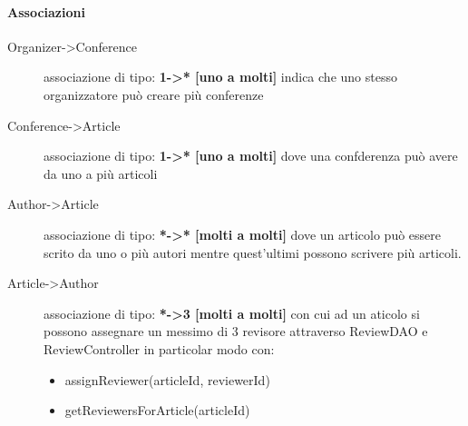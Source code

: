 \paragraph{Associazioni}
\begin{description}
\item [Organizer->Conference] associazione di tipo: \textbf{1->* [uno a molti]} indica che uno stesso organizzatore può creare più conferenze
\item [Conference->Article] associazione di tipo: \textbf{1->* [uno a molti]} dove una confderenza può avere da uno a più articoli
\item [Author->Article] associazione di tipo: \textbf{*->* [molti a molti]} dove un articolo può essere scrito da uno o più autori mentre quest'ultimi possono scrivere più articoli.
\item [Article->Author] associazione di tipo: \textbf{*->3 [molti a molti]} con cui ad un aticolo si possono assegnare un messimo di 3 revisore attraverso ReviewDAO e ReviewController in particolar modo con:
\begin{itemize}
 \item assignReviewer(articleId, reviewerId)
\item getReviewersForArticle(articleId)
\end{itemize}
\end{description}


